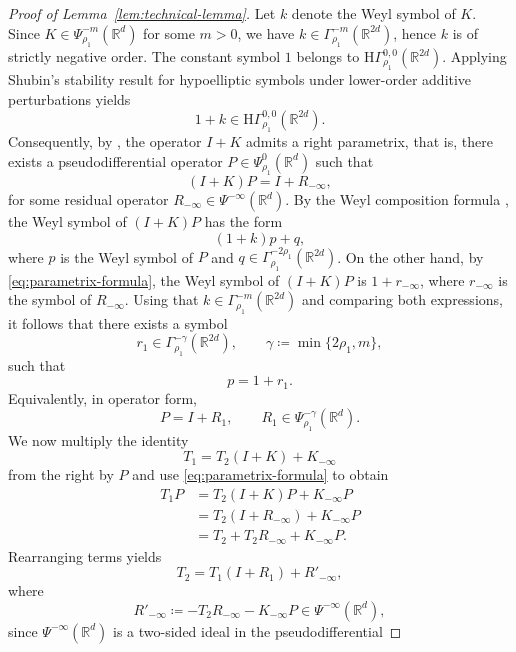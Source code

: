 \documentclass[a4paper,12pt]{article}
\newcommand{\R}{\mathbb{R}}
\begin{document}
\begin{proof}[Proof of Lemma~\ref{lem:technical-lemma}]
Let $k$ denote the Weyl symbol of $K$.
Since $K\in\Psi^{-m}_{\rho_1}(\R^d)$ for some $m>0$, we have
$k\in\Gamma^{-m}_{\rho_1}(\R^{2d})$, hence $k$ is of strictly negative order.
The constant symbol $1$ belongs to $\mathrm{H}\Gamma^{0,0}_{\rho_1}(\R^{2d})$.
Applying Shubin’s stability result for hypoelliptic symbols under lower-order
additive perturbations \cite[Lemma~25.1 (1c)]{shubin_pseudodifferential_2001} 
yields 
\[
1+k \in \mathrm{H}\Gamma^{0,0}_{\rho_1}(\R^{2d}).
\]
Consequently, by \cite[Theorem~25.1]{shubin_pseudodifferential_2001},
the operator $I+K$ admits a right parametrix, that is, there exists a
pseudodifferential operator $P\in\Psi^0_{\rho_1}(\R^d)$ such that
\begin{equation}\label{eq:parametrix-formula}
    (I+K)P = I + R_{-\infty},
\end{equation}
for some residual operator $R_{-\infty}\in\Psi^{-\infty}(\R^d)$.
By the Weyl composition formula \cite[Theorem~23.6]{shubin_pseudodifferential_2001},
the Weyl symbol of $(I+K)P$ has the form
\[
(1+k)p + q,
\]
where $p$ is the Weyl symbol of $P$ and
$q\in\Gamma^{-2\rho_1}_{\rho_1}(\R^{2d})$.
On the other hand, by \eqref{eq:parametrix-formula}, the Weyl symbol of $(I+K)P$
is $1+r_{-\infty}$, where $r_{-\infty}$ is the symbol of $R_{-\infty}$.
Using that $k\in\Gamma^{-m}_{\rho_1}(\R^{2d})$ and comparing both expressions,
it follows that there exists a symbol
\[
r_1 \in \Gamma^{-\gamma}_{\rho_1}(\R^{2d}),
\qquad
\gamma \coloneqq \min\{2\rho_1,m\},
\]
such that
\[
p = 1 + r_1.
\]
Equivalently, in operator form,
\[
P = I + R_1,
\qquad
R_1 \in \Psi^{-\gamma}_{\rho_1}(\R^d).
\]
We now multiply the identity
\[
T_1 = T_2 (I+K) + K_{-\infty}
\]
from the right by $P$ and use \eqref{eq:parametrix-formula} to obtain
\begin{align*}
T_1 P
&= T_2 (I+K)P + K_{-\infty}P \\
&= T_2 (I+R_{-\infty}) + K_{-\infty}P \\
&= T_2 + T_2 R_{-\infty} + K_{-\infty}P.
\end{align*}
Rearranging terms yields
\begin{equation}\label{eq:introduction-of-R1}
    T_2
    =
    T_1 (I+R_1) + R'_{-\infty},
\end{equation}
where
\[
R'_{-\infty} \coloneqq -T_2 R_{-\infty} - K_{-\infty}P
\in \Psi^{-\infty}(\R^d),
\]
since $\Psi^{-\infty}(\R^d)$ is a two-sided ideal in the pseudodifferential

\end{proof}
\end{document}
